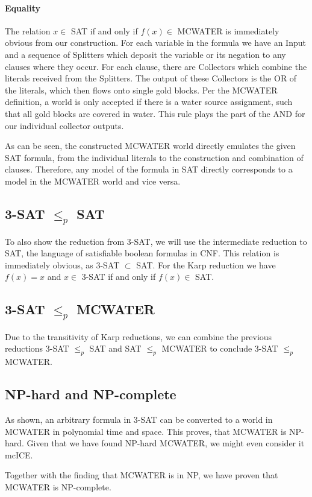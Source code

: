 \paragraph{Equality}
The relation $x \in$ SAT if and only if $f(x) \in$ MCWATER is immediately obvious from our construction. For each variable in the formula we have an Input and a sequence of Splitters which deposit the variable or its negation to any clauses where they occur. For each clause, there are Collectors which combine the literals received from the Splitters. The output of these Collectors is the OR of the literals, which then flows onto single gold blocks. Per the MCWATER definition, a world is only accepted if there is a water source assignment, such that all gold blocks are covered in water. This rule plays the part of the AND for our individual collector outputs.
\linebreak

As can be seen, the constructed MCWATER world directly emulates the given SAT formula, from the individual literals to the construction and combination of clauses. Therefore, any model of the formula in SAT directly corresponds to a model in the MCWATER world and vice versa.



\subsection{3-SAT $\leq_p$ SAT}
To also show the reduction from 3-SAT, we will use the intermediate reduction to SAT, the language of satisfiable boolean formulas in CNF. This relation is immediately obvious, as 3-SAT $\subset$ SAT. For the Karp reduction we have $f(x) = x$ and $x \in$ 3-SAT if and only if $f(x) \in$ SAT.



\subsection{3-SAT $\leq_p$ MCWATER}
Due to the transitivity of Karp reductions, we can combine the previous reductions 3-SAT $\leq_p$ SAT and SAT $\leq_p$ MCWATER to conclude 3-SAT $\leq_p$ MCWATER.



\subsection{NP-hard and NP-complete}
As shown, an arbitrary formula in 3-SAT can be converted to a world in MCWATER in polynomial time and space. This proves, that MCWATER is NP-hard. Given that we have found NP-hard MCWATER, we might even consider it mcICE.

Together with the finding that MCWATER is in NP, we have proven that MCWATER is NP-complete.

